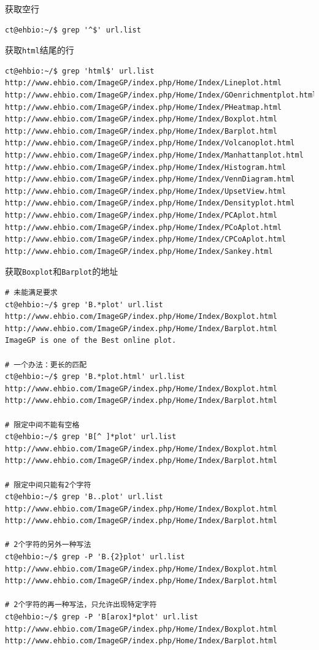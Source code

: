 \documentclass[]{article}
\numberwithin{figure}{section}
\numberwithin{table}{section}
\begin{document}
获取空行

\begin{verbatim}
ct@ehbio:~/$ grep '^$' url.list 
\end{verbatim}

获取\texttt{html}结尾的行

\begin{verbatim}
ct@ehbio:~/$ grep 'html$' url.list 
http://www.ehbio.com/ImageGP/index.php/Home/Index/Lineplot.html
http://www.ehbio.com/ImageGP/index.php/Home/Index/GOenrichmentplot.html
http://www.ehbio.com/ImageGP/index.php/Home/Index/PHeatmap.html
http://www.ehbio.com/ImageGP/index.php/Home/Index/Boxplot.html
http://www.ehbio.com/ImageGP/index.php/Home/Index/Barplot.html
http://www.ehbio.com/ImageGP/index.php/Home/Index/Volcanoplot.html
http://www.ehbio.com/ImageGP/index.php/Home/Index/Manhattanplot.html
http://www.ehbio.com/ImageGP/index.php/Home/Index/Histogram.html
http://www.ehbio.com/ImageGP/index.php/Home/Index/VennDiagram.html
http://www.ehbio.com/ImageGP/index.php/Home/Index/UpsetView.html
http://www.ehbio.com/ImageGP/index.php/Home/Index/Densityplot.html
http://www.ehbio.com/ImageGP/index.php/Home/Index/PCAplot.html
http://www.ehbio.com/ImageGP/index.php/Home/Index/PCoAplot.html
http://www.ehbio.com/ImageGP/index.php/Home/Index/CPCoAplot.html
http://www.ehbio.com/ImageGP/index.php/Home/Index/Sankey.html
\end{verbatim}

获取\texttt{Boxplot}和\texttt{Barplot}的地址

\begin{verbatim}
# 未能满足要求
ct@ehbio:~/$ grep 'B.*plot' url.list 
http://www.ehbio.com/ImageGP/index.php/Home/Index/Boxplot.html
http://www.ehbio.com/ImageGP/index.php/Home/Index/Barplot.html
ImageGP is one of the Best online plot.

# 一个办法：更长的匹配
ct@ehbio:~/$ grep 'B.*plot.html' url.list 
http://www.ehbio.com/ImageGP/index.php/Home/Index/Boxplot.html
http://www.ehbio.com/ImageGP/index.php/Home/Index/Barplot.html

# 限定中间不能有空格
ct@ehbio:~/$ grep 'B[^ ]*plot' url.list 
http://www.ehbio.com/ImageGP/index.php/Home/Index/Boxplot.html
http://www.ehbio.com/ImageGP/index.php/Home/Index/Barplot.html

# 限定中间只能有2个字符
ct@ehbio:~/$ grep 'B..plot' url.list 
http://www.ehbio.com/ImageGP/index.php/Home/Index/Boxplot.html
http://www.ehbio.com/ImageGP/index.php/Home/Index/Barplot.html

# 2个字符的另外一种写法
ct@ehbio:~/$ grep -P 'B.{2}plot' url.list 
http://www.ehbio.com/ImageGP/index.php/Home/Index/Boxplot.html
http://www.ehbio.com/ImageGP/index.php/Home/Index/Barplot.html

# 2个字符的再一种写法，只允许出现特定字符
ct@ehbio:~/$ grep -P 'B[arox]*plot' url.list 
http://www.ehbio.com/ImageGP/index.php/Home/Index/Boxplot.html
http://www.ehbio.com/ImageGP/index.php/Home/Index/Barplot.html
\end{verbatim}
\end{document}
